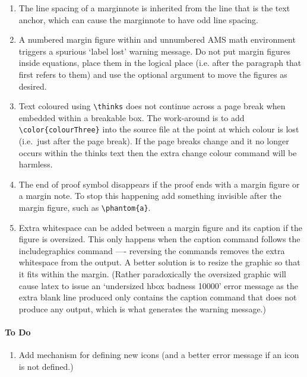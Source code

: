 \documentclass[solutionsatend,twocolumnsolutions]{ouunit}
\begin{document}
\begin{enumerate}[1.]
\item
The line spacing of a marginnote is inherited from the line that is the text anchor, which can cause the marginnote to have odd line spacing.
\item
A numbered margin figure within and unnumbered AMS math environment triggers a spurious `label lost' warning message. Do not put margin figures inside equations, place them in the logical place (i.e. after the paragraph that first refers to them) and use the optional argument to move the figures as desired.
\item
Text coloured using \verb"\thinks" does not continue across a page break when embedded within a breakable box. The work-around is to add \verb"\color{colourThree}" into the source file at the point at which colour is lost (i.e.\ just after the page break). If the page breaks change and it no longer occurs within the thinks text then the extra change colour command will be harmless.
\item
The end of proof symbol disappears if the proof ends with a margin figure or a margin note. To stop this happening add something invisible after the margin figure, such as \verb”\phantom{a}”.
\item
Extra whitespace can be added between a margin figure and its caption if the figure is oversized. This only happens when the caption command follows the includegraphics command ---- reversing the commands removes the extra whitespace from the output. A better solution is to resize the graphic so that it fits within the margin. (Rather paradoxically the oversized graphic will cause latex to issue an `undersized hbox badness 10000' error message as the extra blank line produced only contains the caption command that does not produce any output, which is what generates the warning message.)
\end{enumerate}

\paragraph{To Do}
\begin{enumerate}[1.]
\item
Add mechanism for defining new icons (and a better error message if an icon is not defined.)
\end{enumerate}
\printexercisesolutions
\printactivitysolutions
\printindex
\end{document}
